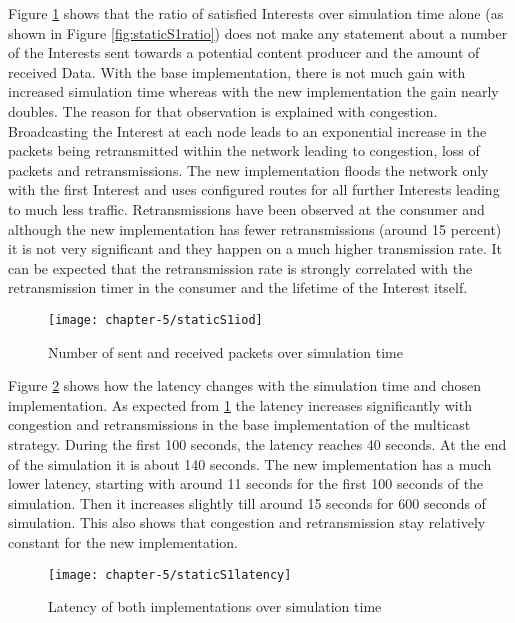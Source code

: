 Figure \ref{fig:staticS1iod} shows that the ratio of satisfied Interests over simulation time alone (as shown in Figure \ref{fig:staticS1ratio}) does not make any statement about a number of the Interests sent towards a potential content producer and the amount of received Data. With the base implementation, there is not much gain with increased simulation time whereas with the new implementation the gain nearly doubles. The reason for that observation is explained with congestion. Broadcasting the Interest at each node leads to an exponential increase in the packets being retransmitted within the network leading to congestion, loss of packets and retransmissions. The new implementation floods the network only with the first Interest and uses configured routes for all further Interests leading to much less traffic. Retransmissions have been observed at the consumer and although the new implementation has fewer retransmissions (around 15 percent) it is not very significant and they happen on a much higher transmission rate. It can be expected that the retransmission rate is strongly correlated with the retransmission timer in the consumer and the lifetime of the Interest itself.

\begin{figure}[H]
  \centering
  \texttt{[image: chapter-5/staticS1iod]}
  \caption{Number of sent and received packets over simulation time}
  \label{fig:staticS1iod}
\end{figure}

Figure \ref{fig:staticS1latency} shows how the latency changes with the simulation time and chosen implementation. As expected from \ref{fig:staticS1iod} the latency increases significantly with congestion and retransmissions in the base implementation of the multicast strategy. During the first 100 seconds, the latency reaches 40 seconds. At the end of the simulation it is about 140 seconds. The new implementation has a much lower latency, starting with around 11 seconds for the first 100 seconds of the simulation. Then it increases slightly till around 15 seconds for 600 seconds of simulation. This also shows that congestion and retransmission stay relatively constant for the new implementation.

\clearpage

\begin{figure}[H]
  \centering
  \texttt{[image: chapter-5/staticS1latency]}
  \caption{Latency of both implementations over simulation time}
  \label{fig:staticS1latency}
\end{figure}

